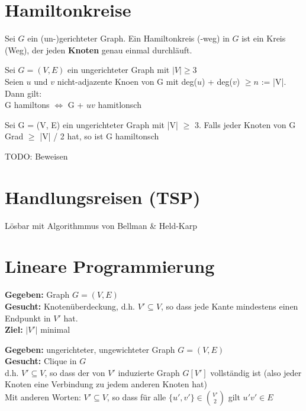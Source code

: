 \documentclass[14pt]{article}
\begin{document}
\section{Hamiltonkreise}
\begin{definition}
    Sei $G$ ein (un-)gerichteter Graph. Ein Hamiltonkreis (-weg)
    in $G$ ist ein Kreis (Weg), der jeden \textbf{Knoten} genau
    einmal durchläuft.
\end{definition}
\begin{eigenschaft}
    Sei $G = (V, E)$ ein ungerichteter Graph mit $|V| \geq 3$ \\
    Seien $u$ und $v$ nicht-adjazente Knoen von G mit deg($u$)
    + deg($v$) $\geq n$ := |V|. Dann gilt: \\
    \indent G hamiltons $\Leftrightarrow$ G + $uv$ hamitlonsch
\end{eigenschaft}
\begin{eigenschaft}
    Sei G = (V, E) ein ungerichteter Graph mit |V| $\geq$ 3.
    Falls jeder Knoten von G Grad $\geq$ |V| / 2 hat, so ist
    G hamiltonsch
\end{eigenschaft}
TODO: Beweisen

\section{Handlungsreisen (TSP)}
Lösbar mit Algorithmmus von Bellman \& Held-Karp

\section{Lineare Programmierung}
\begin{definition}[Knotenüberdeckung]
    \textbf{Gegeben:} Graph $G = (V, E)$ \\
    \textbf{Gesucht:} Knotenüberdeckung, d.h. $V'
        \subseteq V$, so dass jede Kante mindestens einen
    Endpunkt in $V'$ hat. \\
    \textbf{Ziel:} $|V'|$ minimal
\end{definition}
\begin{definition}[Clique]
    \textbf{Gegeben:} ungerichteter, ungewichteter Graph $G = (V, E)$ \\
    \textbf{Gesucht:} Clique in $G$ \\
    d.h. $V' \subseteq V$, so dass der von $V'$ induzierte Graph
    $G[V']$ vollständig ist (also jeder Knoten eine Verbindung
    zu jedem anderen Knoten hat) \\
    Mit anderen Worten: $V' \subseteq V$, so dass für alle $\{u', v'\}
        \in \binom{V'}{2}$ gilt $u'v' \in E$
\end{definition}
\end{document}
